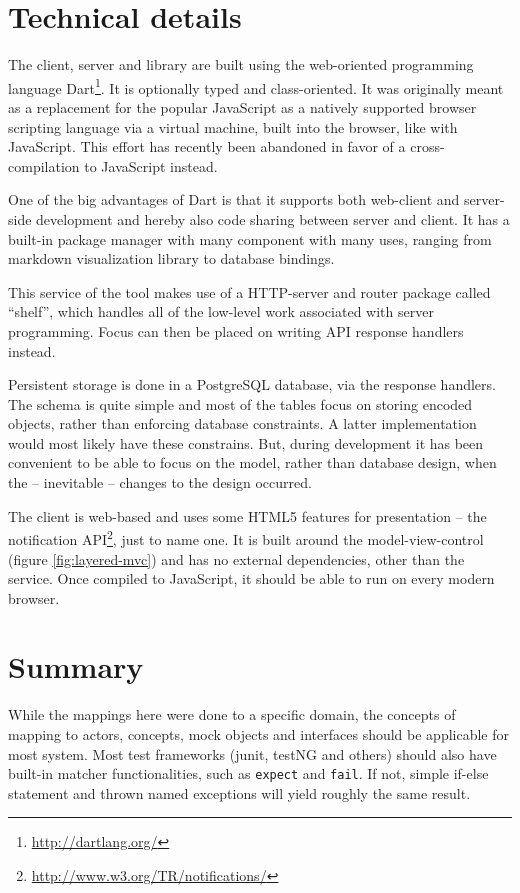 \section{Technical details}
The client, server and library are built using the web-oriented programming language Dart\footnote{\url{http://dartlang.org/}}. It is optionally typed and class-oriented. It was originally meant as a replacement for the popular JavaScript as a natively supported browser scripting language via a virtual machine, built into the browser, like with JavaScript. This effort has recently been abandoned in favor of a cross-compilation to JavaScript instead.\medskip

\noindent One of the big advantages of Dart is that it supports both web-client and server-side development and hereby also code sharing between server and client. It has a built-in package manager with many component with many uses, ranging from markdown visualization library to database bindings.\medskip

\noindent This service of the tool makes use of a HTTP-server and router package called ``shelf'', which handles all of the low-level work associated with server programming. Focus can then be placed on writing API response handlers instead.\medskip

\noindent Persistent storage is done in a PostgreSQL database, via the response handlers. The schema is quite simple and most of the tables focus on storing encoded objects, rather than enforcing database constraints. A latter implementation would most likely have these constrains. But, during development it has been convenient to be able to focus on the model, rather than database design, when the -- inevitable -- changes to the design occurred.\medskip

\noindent The client is web-based and uses some HTML5 features for presentation -- the notification API\footnote{\url{http://www.w3.org/TR/notifications/}}, just to name one. It is built around the model-view-control (figure \ref{fig:layered-mvc}) and has no external dependencies, other than the service. Once compiled to JavaScript, it should be able to run on every modern browser.

\section{Summary}
While the mappings here were done to a specific domain, the concepts of mapping to actors, concepts, mock objects and interfaces should be applicable for most system. Most test frameworks (junit, testNG and others) should also have built-in matcher functionalities, such as \texttt{expect} and \texttt{fail}. If not, simple if-else statement and thrown named exceptions will yield roughly the same result.\medskip

